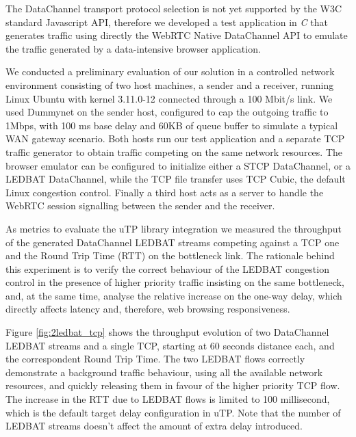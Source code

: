 \documentclass{sig-alternate}
\begin{document}
The DataChannel transport protocol selection is not yet supported by the W3C standard Javascript API, therefore we developed a test application in \textit{C} that generates traffic using directly the WebRTC Native DataChannel API to emulate the traffic generated by a data-intensive browser application.

\label{sec:architecture}


We conducted a preliminary evaluation of our solution in a controlled network environment consisting of two host machines, a sender and a receiver, running Linux Ubuntu with kernel 3.11.0-12 connected through a 100 Mbit/s link. We used Dummynet on the sender host, configured to cap the outgoing traffic to 1Mbps, with 100 ms base delay and 60KB of queue buffer to simulate a typical WAN gateway scenario. Both hosts run our test application and a separate TCP traffic generator to obtain traffic competing on the same network resources. The browser emulator can be configured to initialize either a STCP DataChannel, or a LEDBAT DataChannel, while the TCP file transfer uses TCP Cubic, the default Linux congestion control. Finally a third host acts as a server to handle the WebRTC session signalling between the sender and the receiver.

As metrics to evaluate the uTP library integration we measured the throughput of the generated DataChannel LEDBAT streams competing against a TCP one and the Round Trip Time (RTT) on the bottleneck link. The rationale behind this experiment is to verify the correct behaviour of the LEDBAT congestion control in the presence of higher priority traffic insisting on the same bottleneck, and, at the same time, analyse the relative increase on the one-way delay, which directly affects latency and, therefore, web browsing responsiveness. 

Figure \ref{fig:2ledbat_tcp} shows the throughput evolution of two DataChannel LEDBAT streams and a single TCP, starting at 60 seconds distance each, and the correspondent Round Trip Time. The two LEDBAT flows correctly demonstrate a background traffic behaviour, using all the available network resources, and quickly releasing them in favour of the higher priority TCP flow. The increase in the RTT due to LEDBAT flows is limited to 100 millisecond, which is the default target delay configuration in uTP. Note that the number of LEDBAT streams doesn't affect the amount of extra delay introduced.
\end{document}
